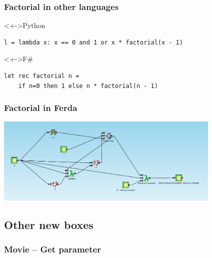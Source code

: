 \documentclass{beamer}
\begin{document}
\begin{frame}[fragile]
        \frametitle{Factorial in other languages}

	\begin{block}<+->{Python}
\begin{verbatim}
l = lambda x: x == 0 and 1 or x * factorial(x - 1)
\end{verbatim}
	\end{block}

	\begin{block}<+->{F\#}
\begin{verbatim}
let rec factorial n =
    if n=0 then 1 else n * factorial(n - 1)
\end{verbatim}
	\end{block}
\end{frame}

\begin{frame}
	\frametitle{Factorial in Ferda}
	\includegraphics[width=10.8cm]{faktorial}
\end{frame}

\subsection{Other new boxes}
\begin{frame}
	\frametitle{Movie -- Get parameter}
\end{frame}
\end{document}
